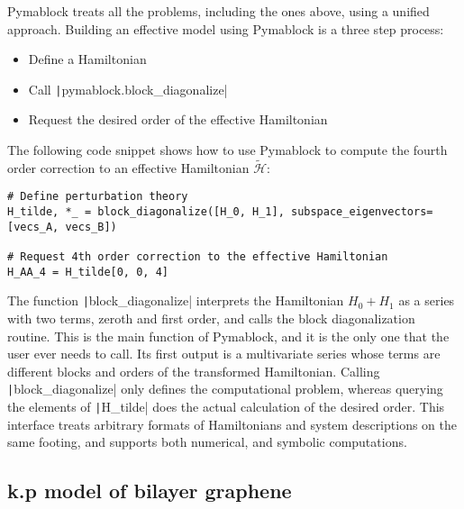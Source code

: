 Pymablock treats all the problems, including the ones above, using a unified
approach.
Building an effective model using Pymablock is a three step process:
%
\begin{itemize}
\item Define a Hamiltonian
\item Call \texttt|pymablock.block_diagonalize|
\item Request the desired order of the effective Hamiltonian
\end{itemize}
%
The following code snippet shows how to use Pymablock to compute the fourth
order correction to an effective Hamiltonian $\tilde{\mathcal{H}}$:
%
\begin{verbatim}
# Define perturbation theory
H_tilde, *_ = block_diagonalize([H_0, H_1], subspace_eigenvectors=[vecs_A, vecs_B])

# Request 4th order correction to the effective Hamiltonian
H_AA_4 = H_tilde[0, 0, 4]
\end{verbatim}
%
The function \texttt|block_diagonalize| interprets the Hamiltonian
$H_0 + H_1$ as a series with two terms, zeroth and first order, and calls the
block diagonalization routine.
This is the main function of Pymablock, and it is the only one that the user
ever needs to call.
Its first output is a multivariate series whose terms are different blocks and
orders of the transformed Hamiltonian.
Calling \texttt|block_diagonalize| only defines the computational
problem, whereas querying the elements of \texttt|H_tilde|
does the actual calculation of the desired order.
This interface treats arbitrary formats of Hamiltonians and system descriptions
on the same footing, and supports both numerical, and symbolic computations.

\subsection{k.p model of bilayer graphene}


